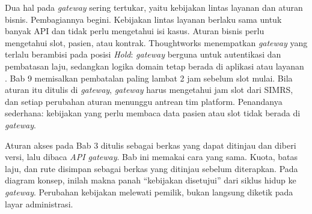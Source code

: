 Dua hal pada \textit{gateway} sering tertukar, yaitu kebijakan lintas layanan dan aturan bisnis. Pembagiannya begini.
Kebijakan lintas layanan berlaku sama untuk banyak API dan tidak perlu mengetahui isi kasus. Aturan bisnis perlu
mengetahui slot, pasien, atau kontrak. Thoughtworks menempatkan \textit{gateway} yang terlalu berambisi pada posisi
\textit{Hold}: \textit{gateway} berguna untuk autentikasi dan pembatasan laju, sedangkan logika domain tetap berada di
aplikasi atau layanan \cite{c10-thoughtworks-gateway}. Bab 9 memisalkan pembatalan paling lambat 2 jam sebelum slot
mulai. Bila aturan itu ditulis di \textit{gateway}, \textit{gateway} harus mengetahui jam slot dari SIMRS, dan setiap
perubahan aturan menunggu antrean tim platform. Penandanya sederhana: kebijakan yang perlu membaca data pasien atau slot
tidak berada di \textit{gateway}.

Aturan akses pada Bab 3 ditulis sebagai berkas yang dapat ditinjau dan diberi versi, lalu dibaca \textit{API gateway}.
Bab ini memakai cara yang sama. Kuota, batas laju, dan rute disimpan sebagai berkas yang ditinjau sebelum diterapkan.
Pada diagram konsep, inilah makna panah ``kebijakan disetujui'' dari siklus hidup ke \textit{gateway}. Perubahan
kebijakan melewati pemilik, bukan langsung diketik pada layar administrasi.

